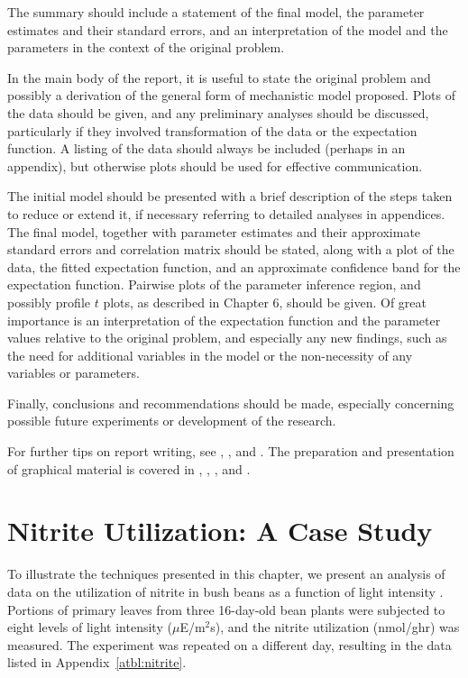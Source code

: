 The summary should include a
statement of the final model, the parameter estimates and their
standard errors, and an interpretation of the model and the
parameters in the context of the original problem.

In the main body of the report, it is useful to state the
original problem and possibly a derivation of the general form of
mechanistic model proposed.
Plots of the data should be given, and any preliminary analyses
should be discussed, particularly if they involved transformation
of the data or the expectation function.
A listing of the data should always be included (perhaps in an
appendix), but otherwise plots should be used for effective
communication.

The initial model should be presented with a brief
description of the steps taken to reduce or extend it, if
necessary referring to detailed analyses in appendices.
The final model, together with parameter estimates and their
approximate standard errors and correlation matrix should be
stated, along with a plot of the data, the fitted expectation
function, and an approximate confidence band for the
expectation function.
Pairwise plots of the parameter inference region,
and possibly profile $t$ plots,
as described in Chapter 6, should be given.
Of great importance is an interpretation of the expectation
function and the parameter values relative to the original
problem, and especially any new findings, such as the need for
additional variables in the model or the non-necessity of any
variables or parameters.

Finally, conclusions and recommendations should be made,
especially concerning possible future experiments or development
of the research.

For further tips on report writing, see ,
, and .
The preparation and presentation of graphical material is covered in
, ,
, and .

\section{Nitrite Utilization:  A Case Study}

To illustrate the techniques presented in this chapter, we present an
analysis of data on the utilization of nitrite in bush beans as
a function of light intensity \cite{elli:peir:1986}.
Portions of primary leaves from three
16-day-old bean plants were subjected to eight levels of light
intensity ($\mu$E/m$^{2}$s), and the nitrite utilization
(nmol/ghr) was measured.
The experiment was repeated on a different day, resulting in the
data listed in Appendix~\ref{atbl:nitrite}.

